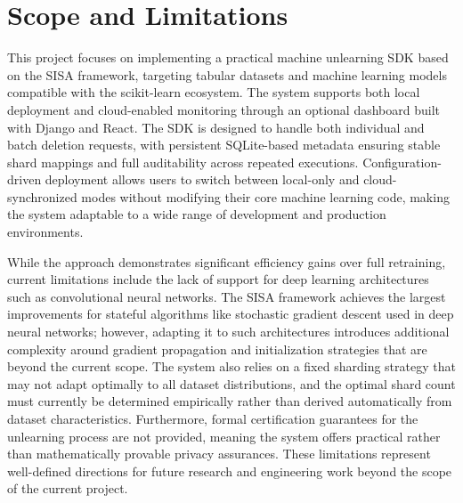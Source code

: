 \section{Scope and Limitations}
This project focuses on implementing a practical machine unlearning SDK based on the SISA framework, targeting tabular datasets and machine learning models compatible with the scikit-learn ecosystem. The system supports both local deployment and cloud-enabled monitoring through an optional dashboard built with Django and React. The SDK is designed to handle both individual and batch deletion requests, with persistent SQLite-based metadata ensuring stable shard mappings and full auditability across repeated executions. Configuration-driven deployment allows users to switch between local-only and cloud-synchronized modes without modifying their core machine learning code, making the system adaptable to a wide range of development and production environments.

While the approach demonstrates significant efficiency gains over full retraining, current limitations include the lack of support for deep learning architectures such as convolutional neural networks. The SISA framework achieves the largest improvements for stateful algorithms like stochastic gradient descent used in deep neural networks; however, adapting it to such architectures introduces additional complexity around gradient propagation and initialization strategies that are beyond the current scope. The system also relies on a fixed sharding strategy that may not adapt optimally to all dataset distributions, and the optimal shard count must currently be determined empirically rather than derived automatically from dataset characteristics. Furthermore, formal certification guarantees for the unlearning process are not provided, meaning the system offers practical rather than mathematically provable privacy assurances. These limitations represent well-defined directions for future research and engineering work beyond the scope of the current project.

